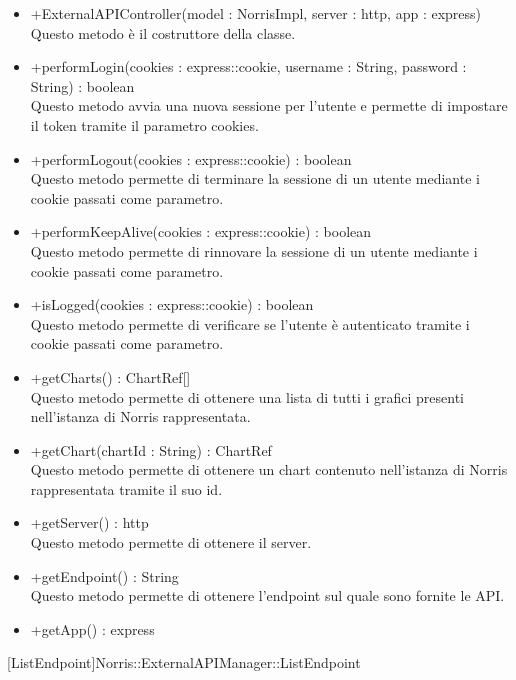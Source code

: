\begin{itemize}
\begin{itemize}
					\item[\ding{111}] {{+ExternalAPIController(model : NorrisImpl, server : http, app : express)}} \\ [1mm] Questo metodo è il costruttore della classe.
					\item[\ding{111}] {{+performLogin(cookies : express::cookie, username : String, password : String) : boolean}} \\ [1mm] Questo metodo avvia una nuova sessione per l'utente e permette di impostare il token tramite il parametro cookies. 
					\item[\ding{111}] {{+performLogout(cookies : express::cookie) : boolean}} \\ [1mm] Questo metodo permette di terminare la sessione di un utente mediante i cookie passati come parametro.
					\item[\ding{111}] {{+performKeepAlive(cookies : express::cookie) : boolean}} \\ [1mm] Questo metodo permette di rinnovare la sessione di un utente mediante i cookie passati come parametro.
					\item[\ding{111}] {{+isLogged(cookies : express::cookie) : boolean}} \\ [1mm] Questo metodo permette di verificare se l'utente è autenticato tramite i cookie passati come parametro.
					\item[\ding{111}] {{+getCharts() : ChartRef[]}} \\ [1mm] Questo metodo permette di ottenere una lista di tutti i grafici presenti nell'istanza di Norris rappresentata.
					\item[\ding{111}] {{+getChart(chartId : String) : ChartRef}} \\ [1mm] Questo metodo permette di ottenere un chart contenuto nell'istanza di Norris rappresentata tramite il suo id.
					\item[\ding{111}] {{+getServer() : http}} \\ [1mm] Questo metodo permette di ottenere il server.
					\item[\ding{111}] {{+getEndpoint() : String}} \\ [1mm] Questo metodo permette di ottenere l'endpoint sul quale sono fornite le API.
					\item[\ding{111}] {{+getApp() : express}}
				\end{itemize}
		
			\end{itemize}

			
			[ListEndpoint]{Norris::ExternalAPIManager::ListEndpoint}
			

